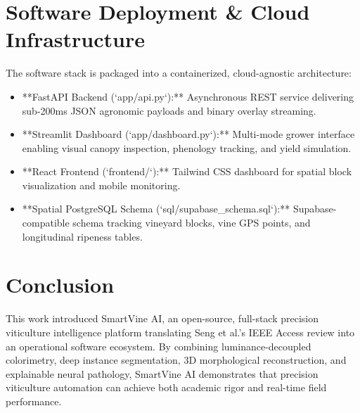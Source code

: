 \documentclass[conference]{IEEEtran}
\begin{document}
\section{Software Deployment \& Cloud Infrastructure}
The software stack is packaged into a containerized, cloud-agnostic architecture:
\begin{itemize}
    \item **FastAPI Backend (`app/api.py`):** Asynchronous REST service delivering sub-200ms JSON agronomic payloads and binary overlay streaming.
    \item **Streamlit Dashboard (`app/dashboard.py`):** Multi-mode grower interface enabling visual canopy inspection, phenology tracking, and yield simulation.
    \item **React Frontend (`frontend/`):** Tailwind CSS dashboard for spatial block visualization and mobile monitoring.
    \item **Spatial PostgreSQL Schema (`sql/supabase_schema.sql`):** Supabase-compatible schema tracking vineyard blocks, vine GPS points, and longitudinal ripeness tables.
\end{itemize}

\section{Conclusion}
This work introduced SmartVine AI, an open-source, full-stack precision viticulture intelligence platform translating Seng et al.'s IEEE Access review into an operational software ecosystem. By combining luminance-decoupled colorimetry, deep instance segmentation, 3D morphological reconstruction, and explainable neural pathology, SmartVine AI demonstrates that precision viticulture automation can achieve both academic rigor and real-time field performance.



\end{document}
